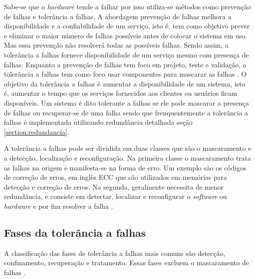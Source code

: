 Sabe-se que o \textit{hardware} tende a falhar por isso utiliza-se métodos como prevenção de falhas e tolerância a falhas. A abordagem 
prevenção de falhas melhora a disponibilidade e a confiabilidade de um serviço, isto é, tem como objetivo prever e eliminar 
o maior número de falhas possíveis antes de colocar o sistema em uso. Mas essa prevenção não resolverá todas as possíveis falhas. 
Sendo assim, a tolerância a falhas fornece disponibilidade de um serviço mesmo com presença de falhas. Enquanto a prevenção de falhas 
tem foco em projeto, teste e validação, a tolerância a falhas tem como foco usar componentes para mascarar as falhas \cite{pankaj1994}.
O objetivo da tolerância a falhas é aumentar a disponibilidade de um sistema, isto é, aumentar o tempo que os serviços fornecidos aos 
clientes ou usuários ficam disponíveis. Um sistema é dito tolerante a falhas se ele pode mascarar a presença de falhas ou recuperar-se 
de uma falha sendo que frenquentemente a tolerância a falhas é implementada utilizando redundância detalhada seção \ref{section:redundancia}.

A tolerância a falhas pode ser dividida em duas classes que são o mascaramento e a detecção, localização e reconfiguração.
Na primeira classe o mascaramento trata as falhas na origem e manifesta-se na forma de erro. Um exemplo são os códigos de correção de 
erros, em inglês \ac{ECC} que são utilizados em memórias para detecção e correção de erros.
Na segunda, geralmente necessita de menor redundância, e consiste em detectar, localizar e reconfigurar o \textit{software} ou
\textit{hardware} e por fim resolver a falha \cite{weber2002}.

\subsection{Fases da tolerância a falhas}

A classificação das fases de tolerância a falhas mais comuns são detecção, confinamento, recuperação e tratamento. Essas fases excluem
o mascaramento de falhas \cite{weber2002}.


